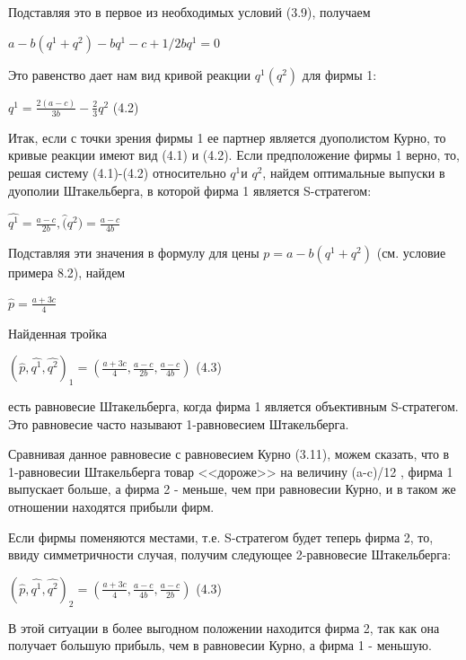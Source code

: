 \documentclass[12pt, 4paper]{book}
\begin{document}
{Подставляя это в первое из необходимых условий (3.9), получаем
\begin{center}
$a-b(q^1+q^2)-bq^1-c+1/2 bq^1 =0$
\end{center}
\par

Это равенство дает нам вид кривой реакции $q^1(q^2)$ для фирмы 1:
\begin{center}
$q^1=\frac{2(a-c)}{3b} - \frac{2}{3}q^2$ (4.2)
\end{center}
Итак, если с точки зрения фирмы 1 ее партнер является дуополистом Курно, то кривые реакции имеют вид (4.1) и (4.2). Если предположение фирмы 1 верно, то, решая систему (4.1)-(4.2) относительно $q^1 $и $q^2$, найдем оптимальные выпуски в дуополии Штакельберга, в которой фирма 1 является S-стратегом:
\begin{center}
$\hat{q^1}=\frac{a-c}{2b}, \hat(q^2)=\frac{a-c}{4b}$
\end{center}
\par

Подставляя эти значения в формулу для цены $p=a-b(q^1+q^2)$ (см. условие примера 8.2), найдем
\begin{center}
$\hat{p}=\frac{a+3c}{4}$
\end{center}
\par

Найденная тройка
\begin{center}
$(\hat{p},\hat{q^1},\hat{q^2})_{1}=(\frac{a+3c}{4},\frac{a-c}{2b},\frac{a-c}{4b})$ (4.3)
\end{center}
есть равновесие Штакельберга, когда фирма 1 является объективным S-стратегом. Это равновесие часто называют 1-равновесием Штакельберга.
\par

Сравнивая данное равновесие с равновесием Курно (3.11), можем сказать, что в 1-равновесии Штакельберга товар <<дороже>> на величину (a-c)/12 , фирма 1 выпускает больше, а фирма 2 - меньше, чем при равновесии Курно, и в таком же отношении находятся прибыли фирм.
\par

Если фирмы поменяются местами, т.е. S-стратегом будет теперь фирма 2, то, ввиду симметричности случая, получим следующее 2-равновесие Штакельберга:
\begin{center}
$(\hat{p},\hat{q^1},\hat{q^2})_{2}=(\frac{a+3c}{4},\frac{a-c}{4b},\frac{a-c}{2b})$ (4.3)
\end{center}
\par

В этой ситуации в более выгодном положении находится фирма 2, так как она получает большую прибыль, чем в равновесии Курно, а фирма 1 - меньшую.
\par

}
\end{document}
